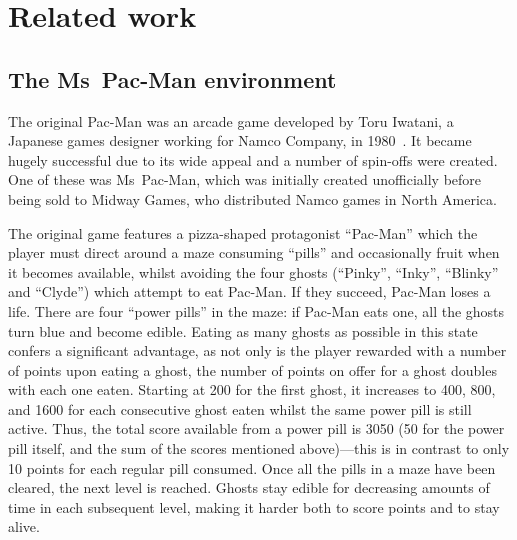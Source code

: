 \chapter{Related work}
\label{ch:related}


\section{The Ms~Pac-Man environment}

The original Pac-Man was an arcade game developed by Toru Iwatani, a Japanese games designer working for Namco Company, in 1980~\citep{Samothrakis2011}.  It became hugely successful due to its wide appeal and a number of spin-offs were created.  One of these was Ms~Pac-Man, which was initially created unofficially before being sold to Midway Games, who distributed Namco games in North America.

The original game features a pizza-shaped protagonist ``Pac-Man'' which the player must direct around a maze consuming ``pills'' and occasionally fruit when it becomes available, whilst avoiding the four ghosts (``Pinky'', ``Inky'', ``Blinky'' and ``Clyde'') which attempt to eat Pac-Man.  If they succeed, Pac-Man loses a life.  There are four ``power pills'' in the maze: if Pac-Man eats one, all the ghosts turn blue and become edible.  Eating as many ghosts as possible in this state confers a significant advantage, as not only is the player rewarded with a number of points upon eating a ghost, the number of points on offer for a ghost doubles with each one eaten.  Starting at 200 for the first ghost, it increases to 400, 800, and 1600 for each consecutive ghost eaten whilst the same power pill is still active.  Thus, the total score available from a power pill is 3050 (50 for the power pill itself, and the sum of the scores mentioned above)---this is in contrast to only 10 points for each regular pill consumed.  Once all the pills in a maze have been cleared, the next level is reached.  Ghosts stay edible for decreasing amounts of time in each subsequent level, making it harder both to score points and to stay alive.

